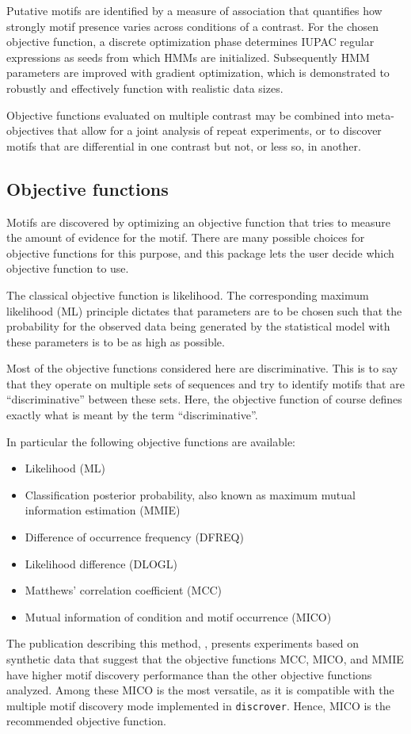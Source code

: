 \documentclass[a4paper]{article}
\newcommand{\discrover}[0]{\texttt{discrover}}
\begin{document}
Putative motifs are identified by a measure of association that quantifies how strongly motif presence varies across conditions of a contrast.
For the chosen objective function, a discrete optimization phase determines IUPAC regular expressions as seeds from which HMMs are initialized.
Subsequently HMM parameters are improved with gradient optimization, which is demonstrated to robustly and effectively function with realistic data sizes.

Objective functions evaluated on multiple contrast may be combined into meta-objectives that allow for a joint analysis of repeat experiments, or to discover motifs that are differential in one contrast but not, or less so, in another.

\subsection{Objective functions}
Motifs are discovered by optimizing an objective function that tries to measure the amount of evidence for the motif.
There are many possible choices for objective functions for this purpose, and this package lets the user decide which objective function to use.

The classical objective function is likelihood.
The corresponding maximum likelihood (ML) principle dictates that parameters are to be chosen such that the probability for the observed data being generated by the statistical model with these parameters is to be as high as possible.

Most of the objective functions considered here are discriminative.
This is to say that they operate on multiple sets of sequences and try to identify motifs that are ``discriminative'' between these sets.
Here, the objective function of course defines exactly what is meant by the term ``discriminative''.

In particular the following objective functions are available:
\begin{itemize}
  \item Likelihood (ML)
  \item Classification posterior probability, also known as maximum mutual information estimation (MMIE)
  \item Difference of occurrence frequency (DFREQ)
  \item Likelihood difference (DLOGL)
  \item Matthews' correlation coefficient (MCC)
  \item Mutual information of condition and motif occurrence (MICO)
\end{itemize}
The publication describing this method, \cite{Maaskola2014}, presents experiments based on synthetic data that suggest that the objective functions MCC, MICO, and MMIE have higher motif discovery performance than the other objective functions analyzed.
Among these MICO is the most versatile, as it is compatible with the multiple motif discovery mode implemented in \discrover{}.
Hence, MICO is the recommended objective function.
\end{document}
